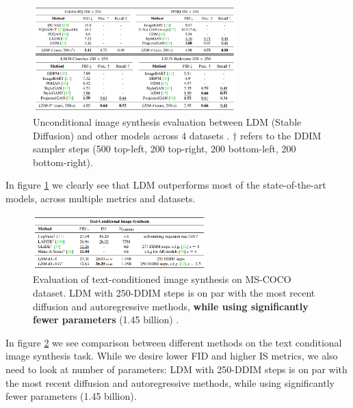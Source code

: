 \begin{figure}
    \centering
    \includegraphics[width=0.7\textwidth]{images/diffusion_models/stable_diffusion/experiments_1.png}
    \caption{Unconditional image synthesis evaluation between LDM (Stable Diffusion) and other models across 4 datasets \cite{stable_diffusion}. $\dagger$ refers to the DDIM sampler steps (500 top-left, 200 top-right, 200 bottom-left, 200 bottom-right).}
    \label{fig:stable_diffusion_experiments_unconditional}
\end{figure}

In figure \ref{fig:stable_diffusion_experiments_unconditional} we clearly see that LDM outperforms most of the state-of-the-art models, across multiple metrics and datasets.

\begin{figure}
    \centering
    \includegraphics[width=0.6\textwidth]{images/diffusion_models/stable_diffusion/experiments_2.png}
    \caption{Evaluation of text-conditioned image synthesis on MS-COCO dataset. LDM with 250-DDIM steps is on par with the most recent diffusion and autoregressive methods, \textbf{while using significantly fewer parameters} (1.45 billion) \cite{stable_diffusion}.}
    \label{fig:stable_diffusion_mscoco}
\end{figure}

In figure \ref{fig:stable_diffusion_mscoco} we see comparison between different methods on the text conditional image synthesis task. While we desire lower FID and higher IS metrics, we also need to look at number of parameters: LDM with 250-DDIM steps is on par with the most recent diffusion and autoregressive methods, while using significantly fewer parameters (1.45 billion).

